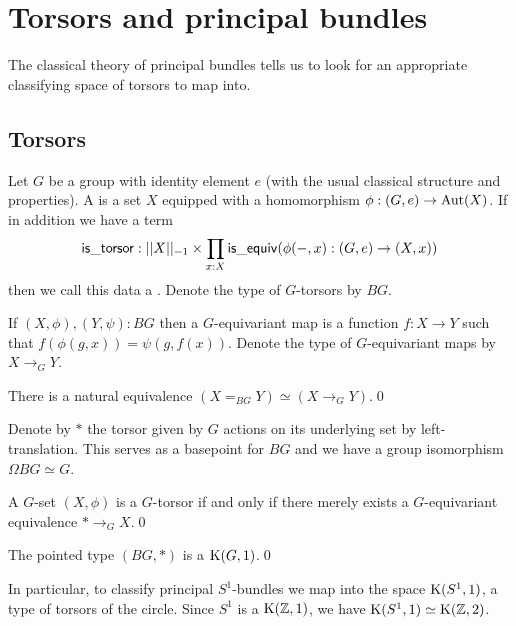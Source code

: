 \section{Torsors and principal bundles}

The classical theory of principal bundles tells us to look for an appropriate classifying space of torsors to map into.

\subsection{Torsors}

\begin{mydef}
Let \( G \) be a group with identity element \( e \) (with the usual classical structure and properties). A  is a set \( X \) equipped with a homomorphism \( \phi:(G,e)\to\operatorname{Aut}(X) \). If in addition we have a term
\[ 
\mathsf{is\_torsor}:||X||_{-1}\times \prod_{x:X}\mathsf{is\_equiv}(\phi(-,x):(G,e)\to (X,x))
\] then we call this data a . Denote the type of \( G \)-torsors by \( BG \).
\end{mydef}

If \( (X,\phi),(Y,\psi):BG \) then a \( G \)-equivariant map is a function \( f:X\to Y \) such that \( f(\phi(g,x))=\psi(g,f(x)) \). Denote the type of \( G \)-equivariant maps by \( X\to_G Y \).

\begin{mylemma}
There is a natural equivalence \( (X=_{BG}Y) \simeq (X\to_G Y) \).\qed
\end{mylemma}

Denote by \( * \) the torsor given by \( G \) actions on its underlying set by left-translation. This serves as a basepoint for \( BG \) and we have a group isomorphism \( \Omega BG\simeq G \).

\begin{mylemma}
A \( G \)-set \( (X,\phi) \) is a \( G \)-torsor if and only if there merely exists a \( G \)-equivariant equivalence \( *\to_G X \).\qed
\end{mylemma}

\begin{mycor}
The pointed type \( (BG,*) \) is a \( \mathrm{K}(G,1) \).\qed
\end{mycor}

In particular, to classify principal \( S^1 \)-bundles we map into the space \( \mathrm{K}(S^1, 1) \), a type of torsors of the circle. Since \( S^1 \) is a \( \mathrm{K}(\mathbb{Z},1) \), we have \( \mathrm{K}(S^1,1)\simeq\mathrm{K}(\mathbb{Z},2) \).

